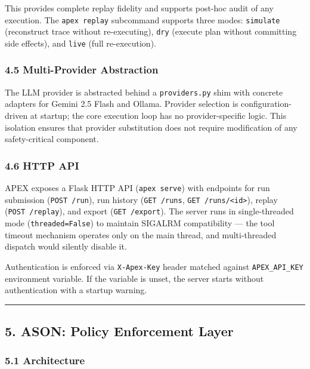 \documentclass[
]{article}
\begin{document}
This provides complete replay fidelity and supports post-hoc audit of
any execution. The \texttt{apex\ replay} subcommand supports three
modes: \texttt{simulate} (reconstruct trace without re-executing),
\texttt{dry} (execute plan without committing side effects), and
\texttt{live} (full re-execution).

\subsubsection{4.5 Multi-Provider
Abstraction}\label{45-multi-provider-abstraction}

The LLM provider is abstracted behind a \texttt{providers.py} shim with
concrete adapters for Gemini 2.5 Flash and Ollama. Provider selection is
configuration-driven at startup; the core execution loop has no
provider-specific logic. This isolation ensures that provider
substitution does not require modification of any safety-critical
component.

\subsubsection{4.6 HTTP API}\label{46-http-api}

APEX exposes a Flask HTTP API (\texttt{apex\ serve}) with endpoints for
run submission (\texttt{POST\ /run}), run history (\texttt{GET\ /runs},
\texttt{GET\ /runs/\textless{}id\textgreater{}}), replay
(\texttt{POST\ /replay}), and export (\texttt{GET\ /export}). The server
runs in single-threaded mode (\texttt{threaded=False}) to maintain
SIGALRM compatibility --- the tool timeout mechanism operates only on
the main thread, and multi-threaded dispatch would silently disable it.

Authentication is enforced via \texttt{X-Apex-Key} header matched
against \texttt{APEX\_API\_KEY} environment variable. If the variable is
unset, the server starts without authentication with a startup warning.

\begin{center}\rule{0.5\linewidth}{0.5pt}\end{center}

\subsection{5. ASON: Policy Enforcement
Layer}\label{5-ason-policy-enforcement-layer}

\subsubsection{5.1 Architecture}\label{51-architecture}
\end{document}

